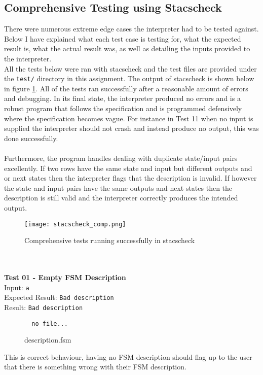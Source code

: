 \documentclass{article}
\begin{document}
\subsection{Comprehensive Testing using Stacscheck}
There were numerous extreme edge cases the interpreter had to be tested against. Below I have explained what each test case is testing for, what the expected result is, what the actual result was, as well as detailing the inputs provided to the interpreter. \\

\noindent All the tests below were ran with stacscheck and the test files are provided under the \verb+test/+ directory in this assignment. The output of stacscheck is shown below in figure \ref{fig:stacscheck_comp}. All of the tests ran successfully after a reasonable amount of errors and debugging. In its final state, the interpreter produced no errors and is a robust program that follows the specification and is programmed defensively where the specification becomes vague. For instance in Test 11 when no input is supplied the interpreter should not crash and instead produce no output, this was done successfully.
\\ \\ \noindent Furthermore, the program handles dealing with duplicate state/input pairs excellently. If two rows have the same state and input but different outputs and or next states then the interpreter flags that the description is invalid. If however the state and input pairs have the same outputs and next states then the description is still valid and the interpreter correctly produces the intended output.
\begin{figure}[H]
\centering
\texttt{[image: stacscheck\_comp.png]}
\caption{Comprehensive tests running successfully in stacscheck}
\label{fig:stacscheck_comp}
\end{figure}

\noindent \\ \\ \textbf{Test 01 - Empty FSM Description} \\
\noindent Input: \verb+a+ \\
Expected Result: \verb+Bad description+ \\
Result: \verb+Bad description+ \\
\begin{figure}[H]
\center
\begin{BVerbatim}
  no file...
\end{BVerbatim}
\caption{description.fsm}
\end{figure}
\noindent This is correct behaviour, having no FSM description should flag up to the user that there is something wrong with their FSM description.
\end{document}
